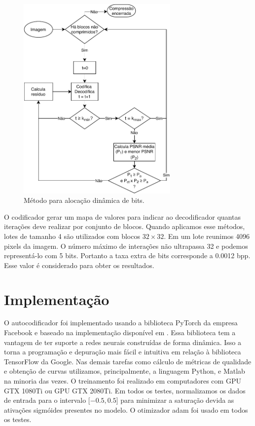\begin{figure}
\centering
\includegraphics[width=0.7\textwidth]{figuras/fluxograma.pdf}
\caption[Método para alocação dinâmica de bit]{Método para alocação dinâmica de bits.}
\label{fig:flux_vr}
\end{figure}		

O codificador gerar um mapa de valores para indicar ao decodificador quantas iterações deve realizar por conjunto de blocos. Quando aplicamos esse métodos, lotes de tamanho 4 são utilizados com blocos $32 \times 32$. Em um lote reunimos 4096 pixels da imagem.
O número máximo de interações não ultrapassa 32 e podemos representá-lo com 5 bits. Portanto a taxa extra de bits corresponde a 0.0012 bpp. Esse valor é considerado para obter os resultados.    

\section{Implementação}

O autocodificador foi implementado usando a biblioteca PyTorch da empresa Facebook e baseado na implementação disponível em \cite{implementationRNNPytorch}. Essa biblioteca tem a vantagem de ter suporte a redes neurais construídas de forma dinâmica. Isso a torna a programação e depuração mais fácil e intuitiva em relação à biblioteca TensorFlow da Google. 
Nas demais tarefas como cálculo de métricas de qualidade e obtenção de curvas utilizamos, principalmente, a linguagem Python, e Matlab na minoria das vezes. O treinamento foi realizado em computadores com  GPU GTX 1080Ti ou GPU GTX 2080Ti. 
Em todos os testes, normalizamos os dados de entrada para o intervalo [$-0.5,0.5$] para minimizar a saturação devida as ativações sigmóides presentes no modelo. O otimizador \acrshort{adam} foi usado em todos os testes.   




